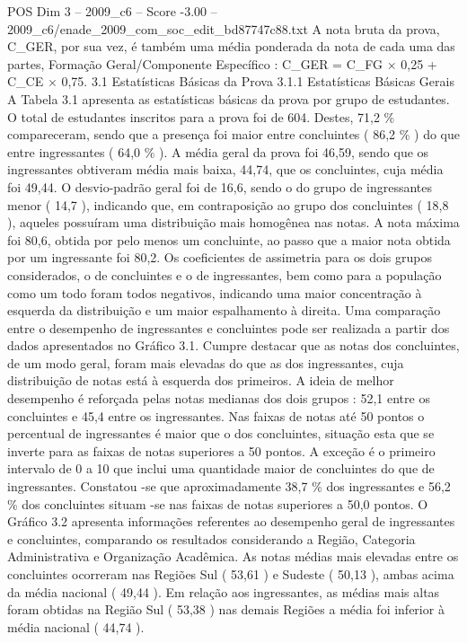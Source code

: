 \begin{textsample}{POS Dim 3 – 2009\_c6 – Score -3.00 – 2009\_c6/enade\_2009\_com\_soc\_edit\_bd87747c88.txt}
A nota bruta da prova, C\_GER, por sua vez, é também uma média ponderada da nota de cada uma das partes, Formação Geral/Componente Específico : C\_GER = C\_FG × 0,25 + C\_CE × 0,75. 3.1 Estatísticas Básicas da Prova 3.1.1 Estatísticas Básicas Gerais A Tabela 3.1 apresenta as estatísticas básicas da prova por grupo de estudantes.
O total de estudantes inscritos para a prova foi de 604.
Destes, 71,2 \% compareceram, sendo que a presença foi maior entre concluintes ( 86,2 \% ) do que entre ingressantes ( 64,0 \% ).
A média geral da prova foi 46,59, sendo que os ingressantes obtiveram média mais baixa, 44,74, que os concluintes, cuja média foi 49,44.
O desvio-padrão geral foi de 16,6, sendo o do grupo de ingressantes menor ( 14,7 ), indicando que, em contraposição ao grupo dos concluintes ( 18,8 ), aqueles possuíram uma distribuição mais homogênea nas notas.
A nota máxima foi 80,6, obtida por pelo menos um concluinte, ao passo que a maior nota obtida por um ingressante foi 80,2.
Os coeficientes de assimetria para os dois grupos considerados, o de concluintes e o de ingressantes, bem como para a população como um todo foram todos negativos, indicando uma maior concentração à esquerda da distribuição e um maior espalhamento à direita.
Uma comparação entre o desempenho de ingressantes e concluintes pode ser realizada a partir dos dados apresentados no Gráfico 3.1.
Cumpre destacar que as notas dos concluintes, de um modo geral, foram mais elevadas do que as dos ingressantes, cuja distribuição de notas está à esquerda dos primeiros.
A ideia de melhor desempenho é reforçada pelas notas medianas dos dois grupos : 52,1 entre os concluintes e 45,4 entre os ingressantes.
Nas faixas de notas até 50 pontos o percentual de ingressantes é maior que o dos concluintes, situação esta que se inverte para as faixas de notas superiores a 50 pontos.
A exceção é o primeiro intervalo de 0 a 10 que inclui uma quantidade maior de concluintes do que de ingressantes.
Constatou -se que aproximadamente 38,7 \% dos ingressantes e 56,2 \% dos concluintes situam -se nas faixas de notas superiores a 50,0 pontos.
O Gráfico 3.2 apresenta informações referentes ao desempenho geral de ingressantes e concluintes, comparando os resultados considerando a Região, Categoria Administrativa e Organização Acadêmica.
As notas médias mais elevadas entre os concluintes ocorreram nas Regiões Sul ( 53,61 ) e Sudeste ( 50,13 ), ambas acima da média nacional ( 49,44 ).
Em relação aos ingressantes, as médias mais altas foram obtidas na Região Sul ( 53,38 ) nas demais Regiões a média foi inferior à média nacional ( 44,74 ).

\end{textsample}

